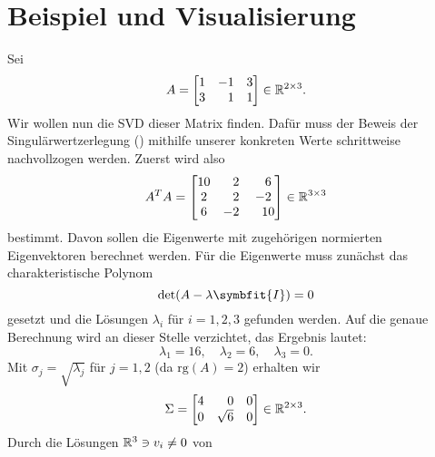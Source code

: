 \section{Beispiel und Visualisierung}
\begin{example}\label{ex:svd}
    Sei 
    \begin{equation*}
        A =
        \begin{bmatrix}
            1 & -1 & 3 \\
            3 & \phantom{-}1 & 1
        \end{bmatrix} \in \mathbb{R}^{2 \times 3}.
    \end{equation*}
    Wir wollen nun die SVD dieser Matrix finden.
    Dafür muss der Beweis der Singulärwertzerlegung () mithilfe unserer konkreten Werte schrittweise nachvollzogen werden.
    Zuerst wird also
    \begin{equation*}
        A^{T}A = 
        \begin{bmatrix}
            10 & \phantom{-}2 & \phantom{-}6 \\
            2 & \phantom{-}2 & -2 \\
            6 & -2 & \phantom{-}10
        \end{bmatrix} \in \mathbb{R}^{3 \times 3}
    \end{equation*}
    bestimmt. 
    Davon sollen die Eigenwerte mit zugehörigen normierten Eigenvektoren berechnet werden.
    Für die Eigenwerte muss zunächst das charakteristische Polynom 
    \begin{equation*}
        \text{det}(A - \lambda \symbfit{I}) = 0
    \end{equation*}    
    gesetzt und die Lösungen \(\lambda_i\) für \(i =1,2,3\) gefunden werden.
    Auf die genaue Berechnung wird an dieser Stelle verzichtet, das Ergebnis lautet:
    \begin{equation*}
        \lambda_1 = 16, \quad 
        \lambda_2 = 6, \quad
        \lambda_3 = 0.
    \end{equation*}
    Mit \(\sigma_j = \sqrt{\lambda_j}\) für \(j = 1, 2\) (da \(\text{rg}(A)=2\)) erhalten wir
    \begin{equation*}
        \Sigma=
        \begin{bmatrix}
            4 & \phantom{\surd}0 & 0 \\
            0 & \sqrt{6} & 0
        \end{bmatrix} \in \mathbb{R}^{2 \times 3}.
    \end{equation*}
    Durch die Lösungen \(\mathbb{R}^{3} \ni v_i \neq 0\) von

\end{example}
